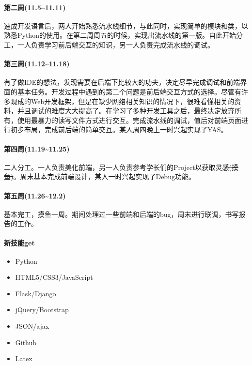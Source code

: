 \documentclass[12pt]{article} %
\begin{document}
\begin{sloppypar}
\paragraph{第二周(11.5\~{}11.11)}

速成开发语言后，两人开始熟悉流水线细节，与此同时，实现简单的模块和类，以熟悉Python的使用。在第二周周五的时候，实现出流水线的第一版。自此开始分工，一人负责学习前后端交互的知识，另一人负责完成流水线的调试。

\paragraph{第三周(11.12\~{}11.18)}

有了做IDE的想法，发现需要在后端下比较大的功夫，决定尽早完成调试和前端界面的基本任务。开发过程中遇到的第二个问题是前后端交互方式的选择。尽管有许多现成的Web开发框架，但是在缺少网络相关知识的情况下，很难看懂相关的资料，并且调试的难度大大提高了。在学习了多种开发工具之后，最终决定放弃所有，使用最暴力的读写文件方式进行交互。完成流水线的调试，值后对前端页面进行初步布局，完成前后端的简单交互。某人周四晚上一时兴起实现了YAS。

\paragraph{第四周(11.19\~{}11.25)}

二人分工。一人负责美化前端，另一人负责参考学长们的Project以获取灵感\sout{(摸鱼)}。周末基本完成前端设计，某人一时兴起实现了Debug功能。

\paragraph{第五周(11.26\~{}12.2)}

基本完工，摸鱼一周。期间处理过一些前端和后端的bug，周末进行联调，书写报告的工作。

\paragraph{新技能get}
\begin{itemize}
\item Python
\item HTML5/CSS3/JavaScript
\item Flask/Django
\item jQuery/Bootstrap
\item JSON/ajax
\item Github
\item Latex
\end{itemize}


\end{sloppypar}
\end{document}
